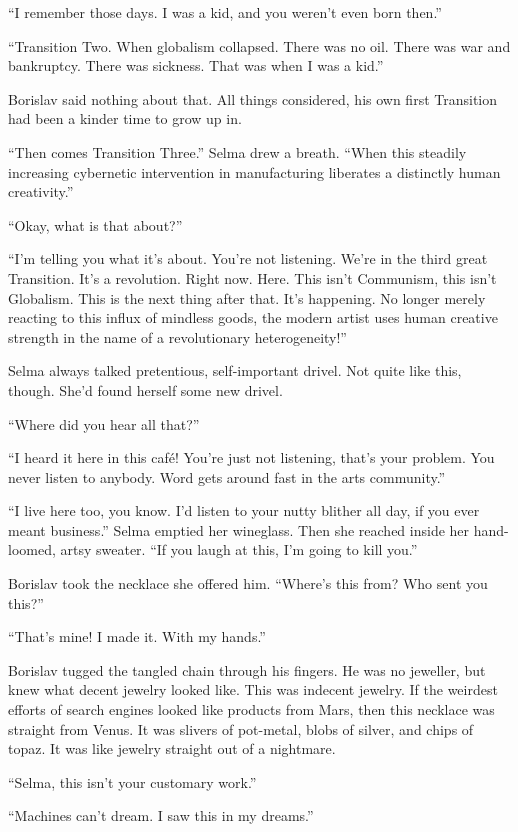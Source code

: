 \documentclass[20 pt,twoside,extrafontsizes,final]{memoir}
\begin{document}
``I remember those days. I was a kid, and you weren't even born then.''

``Transition Two. When globalism collapsed. There was no oil. There was war and bankruptcy. There was sickness. That was when I was a kid.''

Borislav said nothing about that. All things considered, his own first Transition had been a kinder time to grow up in.

``Then comes Transition Three.'' Selma drew a breath. ``When this steadily increasing cybernetic intervention in manufacturing liberates a distinctly human creativity.''

``Okay, what is that about?''

``I'm telling you what it's about. You're not listening. We're in the third great Transition. It's  a revolution. Right now. Here. This isn't Communism, this isn't Globalism. This is the next thing after that. It's happening. No longer merely reacting to this influx of mindless goods, the modern artist uses human creative strength in the name of a revolutionary heterogeneity!''

Selma always talked pretentious, self-important drivel. Not quite like this, though. She'd found herself some new drivel.

``Where did you hear all that?''

``I heard it here in this caf\'e! You're just not listening, that's your problem. You never listen to anybody. Word gets around fast in the arts community.''

``I live here too, you know. I'd listen to your nutty blither all day, if you ever meant business.''
Selma emptied her wineglass. Then she reached inside her hand-loomed, artsy sweater. ``If you laugh at this, I'm going to kill you.''

Borislav took the necklace she offered him. ``Where's this from? Who sent you this?''

``That's mine! I made it. With my hands.''

Borislav tugged the tangled chain through his fingers. He was no jeweller, but knew what decent jewelry looked like. This was indecent jewelry. If the weirdest efforts of search engines looked like products from Mars, then this necklace was straight from Venus. It was slivers of pot-metal, blobs of silver, and chips of topaz. It was like jewelry straight out of a nightmare.

``Selma, this isn't your customary work.''

``Machines can't dream. I saw this in my dreams.''
\end{document}
